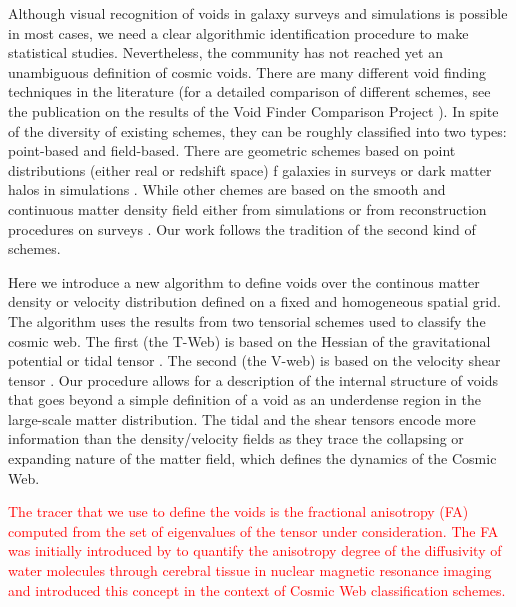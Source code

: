 \documentclass[a4,useAMS,usenatbib,usegraphicx]{mn2e}
\newcommand{\before}[1]{\textcolor{red}{ #1}}
\begin{document}
Although visual recognition of voids in galaxy surveys and simulations
is possible in most cases, we need a clear algorithmic identification
procedure to make statistical studies.
Nevertheless, the community has not reached yet an unambiguous
definition of cosmic voids.
There are many different void finding techniques in the literature
(for a detailed comparison of different schemes,  see the publication
on the results of the Void Finder Comparison Project \citet{Colberg08}).  
In spite of the diversity of existing schemes, they can be roughly
classified into two types: point-based and field-based. 
There are geometric schemes based on point distributions (either real or
redshift space)  f galaxies in surveys or dark matter halos in
simulations \citep{Kauffmann91, Muller00,    Gottlober03, Hoyle04,
  Brunino07,  Foster09, Micheletti14, Sutter14}. 
While other chemes are based on the smooth and continuous matter density
field either from simulations or from reconstruction procedures on
surveys \citep{Plionis02, Colberg05,  Shandarin06, Platen07,
  Neyrinck08, MunozCuartas11, Neyrinck13, Ricciardelli2013}. 
Our work follows the tradition of the second kind of schemes. 


Here we introduce a new algorithm to define voids over the continous
matter density or velocity distribution defined on a fixed and
homogeneous spatial grid.
The algorithm uses the results from two tensorial schemes used to
classify the cosmic web.
The first (the T-Web) is based on the Hessian of the gravitational potential or
tidal tensor \citep{Hahn07, Forero09}. 
The second (the V-web) is based on the velocity shear tensor
\citep{Hoffman12}. 
Our procedure allows for a description of the internal structure
of voids that goes beyond a simple definition of a void as an
underdense region in the large-scale matter distribution.
The tidal and the shear tensors encode more information than the
density/velocity fields as they trace the collapsing or expanding
nature of the matter field, which defines the dynamics of the Cosmic
Web. 


\before{ The tracer that we use to define the 
voids is the fractional anisotropy (FA) computed from the set of 
eigenvalues of the tensor under consideration. 
The FA was initially introduced by \citet{Basser95} to quantify the
anisotropy degree of the diffusivity of water molecules through
cerebral tissue in nuclear magnetic resonance
imaging and \citet{Libeskind13} introduced this concept in the context
of Cosmic Web classification schemes.}
\end{document}
